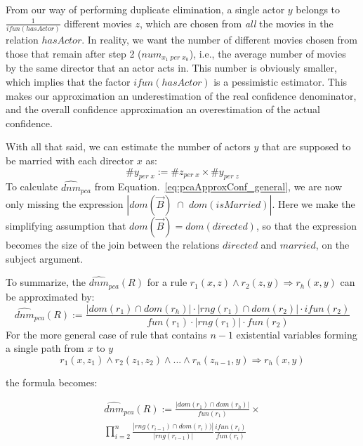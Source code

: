 {From our way of performing duplicate elimination, a single actor $y$ belongs to $\frac{1}{ifun(hasActor)}$ different movies $z$, 
which are chosen from \emph{all} the movies in the relation $hasActor$.
In reality, we want the number of different movies chosen from those that remain after step 2 ($num_{x_1\; per \; x_0}$), %
i.e., the average number of movies by the same director that an actor acts in. This number is obviously smaller, which
implies that the factor $ifun(hasActor)$ is a pessimistic estimator. This makes 
our approximation an underestimation of the real confidence denominator, 
and the overall confidence approximation an overestimation of the actual confidence.

With all that said, we can estimate the number of actors $y$ that are supposed to be married with each director $x$ as:
$$
 \#y_{per\;x} :=  \#z_{per \; x} \times \#y_{ per \; z}
$$
\noindent To calculate $\widehat{dnm}_{pca}$ from Equation.~\ref{eq:pcaApproxConf_general}, we are now only missing 
the expression $|dom(\vec{B})\;\cap\;dom(isMarried)|$. 
Here we make the simplifying assumption that $dom(\vec{B}) = dom(directed)$, so that the expression
becomes the size of the join between the relations $directed$ and $married$, on the subject argument.

To summarize, the $ \widehat{dnm}_{pca}(R)$ for a rule $r_1(x,z)\wedge r_2(z,y) \Rightarrow r_h(x,y)$ can be approximated by:
\[
  \widehat{dnm}_{pca}(R) := \frac{|dom(r_1) \cap dom(r_h)| \cdot |rng(r_1) \cap dom(r_2)| \cdot ifun(r_2)  }{fun(r_1) \cdot |rng(r_1)| \cdot fun(r_2)}
\]
For the more general case of rule that contains $n-1$ existential variables forming a single path from $x$ to $y$
$$
  r_1(x,z_1) \wedge r_2(z_1,z_2) \wedge ... \wedge r_n(z_{n-1},y) \Rightarrow r_h(x,y)
$$

\noindent the formula becomes:

\begin{eqnarray*}
  \widehat{dnm}_{pca}(R) := \frac{|dom(r_1) \cap dom(r_h)|}{fun(r_1)}  \times \\
  \prod_{i=2}^{n}\frac{|rng(r_{i-1})\cap dom(r_i))|}{|rng(r_{i-1})|}\frac{ifun(r_i)}{fun(r_i)}
\end{eqnarray*}

}
